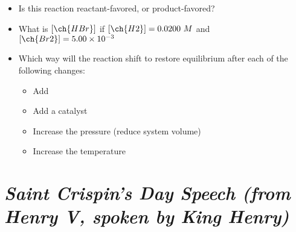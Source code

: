 \documentclass[11pt, letterpaper]{memoir}
\begin{document}
{\begin{itemize}
	\vspace{2em}
	\item Is this reaction reactant-favored, or product-favored?
	
	\vspace{2em}
	\item What is $\left[\ch{HBr}\right]$ if $\left[\ch{H2}\right] = 0.0200~M$ and $\left[\ch{Br2}\right]=5.00\times10^{-3}$
	
	\vspace{2em}
	\item Which way will the reaction shift to restore equilibrium after each of the following changes:
	\begin{itemize}
		\item Add 
		\item Add a catalyst
		\item Increase the pressure (reduce system volume)
		\item Increase the temperature
	\end{itemize}
\end{itemize}
\newpage
{}
\pagestyle{empty}
\addtocounter{page}{-1}
\section*{\emph{Saint Crispin's Day Speech (from \emph{Henry V}, spoken by King Henry)}}
}
\end{document}
